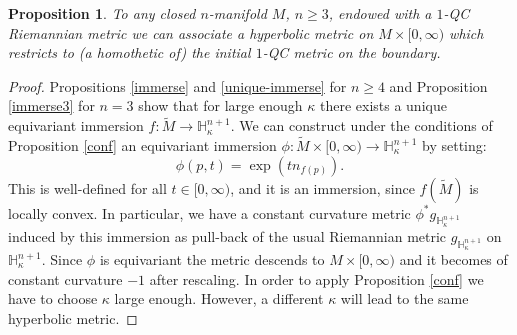 \documentclass[JEP,XML,SOM,Unicode]{cedram}
\newtheorem{proposition}[theorem]{Proposition}
\theoremstyle{definition}
\theoremstyle{remark}
\numberwithin{equation}{section}
\begin{document}
\begin{proposition}\label{hyperbolicmetric}
To any closed $n$-manifold $M$, $n\geq3$, endowed with a $1$-QC Riemannian metric we can associate
a hyperbolic metric on $M\times [0,\infty)$ which restricts to (a homothetic of)
the initial $1$-QC metric on the boundary.
\end{proposition}
\begin{proof}
Propositions \ref{immerse} and \ref{unique-immerse} for $n\geq4$ and Proposition \ref{immerse3} for $n=3$ show that for large enough $\kappa$ there exists a unique equivariant immersion $f:\widetilde{M}\to \mathbb H_{\kappa}^{n+1}$.
We can construct under the conditions of Proposition \ref{conf} an equivariant immersion
$\phi:\widetilde{M}\times [0,\infty) \to \mathbb H_{\kappa}^{n+1}$
by setting:
\[ \phi(p, t)=\exp(t n_{f(p)}).\]
This is well-defined for all $t\in [0, \infty)$,
and it is an immersion, since $f(\widetilde{M})$ is locally convex.
In particular, we have a constant
curvature metric $\phi^*g_{\mathbb H_{\kappa}^{n+1}}$ induced by this immersion
as pull-back of the usual Riemannian metric $g_{\mathbb H_{\kappa}^{n+1}}$ on
$\mathbb H_{\kappa}^{n+1}$. Since $\phi$ is equivariant the metric descends to
$M\times [0,\infty)$ and it becomes of constant curvature $-1$ after rescaling.
In order to apply Proposition \ref{conf} we have to choose
$\kappa$ large enough. However, a different $\kappa$ will lead to the same
hyperbolic metric.
\end{proof}
\end{document}
